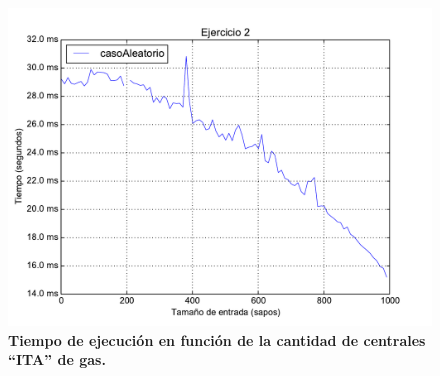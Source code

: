 \documentclass[11pt, a4paper, twoside]{article}
\begin{document}
\begin{figure}[H]
   \begin{center}
   \includegraphics[width=1.4\textwidth,angle=90]{../ej2/graficos/test_variarCantidadCentrales.pdf}
   \caption{\textbf{Tiempo de ejecución en función de la cantidad de centrales ``ITA'' de gas.}}
   \label{fig:ej2-graf-3}
   \end{center}
\end{figure}
\clearpage
   
\end{document}
